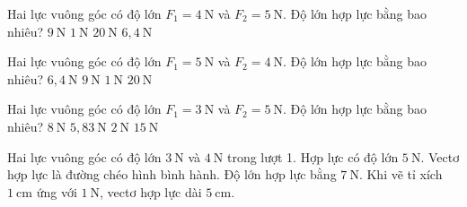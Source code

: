 \begin{ex}
Hai lực vuông góc có độ lớn $F_1=4\ \mathrm{N}$ và $F_2=5\ \mathrm{N}$. Độ lớn hợp lực bằng bao nhiêu?
\choice
{$9\ \mathrm{N}$}
{$1\ \mathrm{N}$}
{$20\ \mathrm{N}$}
{\True $6,4\ \mathrm{N}$}
\end{ex}

\begin{ex}
Hai lực vuông góc có độ lớn $F_1=5\ \mathrm{N}$ và $F_2=4\ \mathrm{N}$. Độ lớn hợp lực bằng bao nhiêu?
\choice
{\True $6,4\ \mathrm{N}$}
{$9\ \mathrm{N}$}
{$1\ \mathrm{N}$}
{$20\ \mathrm{N}$}
\end{ex}

\begin{ex}
Hai lực vuông góc có độ lớn $F_1=3\ \mathrm{N}$ và $F_2=5\ \mathrm{N}$. Độ lớn hợp lực bằng bao nhiêu?
\choice
{$8\ \mathrm{N}$}
{\True $5,83\ \mathrm{N}$}
{$2\ \mathrm{N}$}
{$15\ \mathrm{N}$}
\end{ex}

\begin{ex}
Hai lực vuông góc có độ lớn $3\ \mathrm{N}$ và $4\ \mathrm{N}$ trong lượt 1.
\choiceTF
{\True Hợp lực có độ lớn $5\ \mathrm{N}$.}
{\True Vectơ hợp lực là đường chéo hình bình hành.}
{Độ lớn hợp lực bằng $7\ \mathrm{N}$.}
{\True Khi vẽ tỉ xích $1\ \mathrm{cm}$ ứng với $1\ \mathrm{N}$, vectơ hợp lực dài $5\ \mathrm{cm}$.}
\end{ex}

